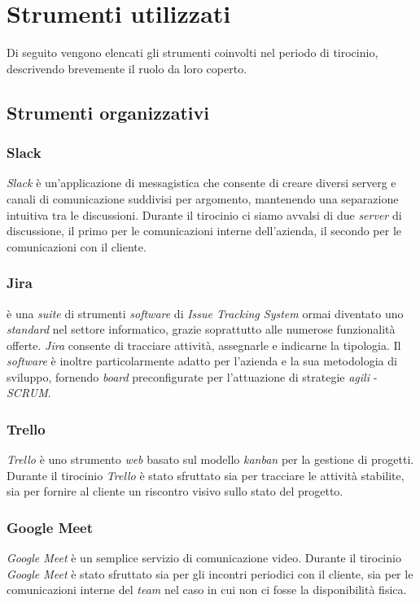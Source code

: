 \section{Strumenti utilizzati}
Di seguito vengono elencati gli strumenti coinvolti nel periodo di tirocinio, descrivendo brevemente il ruolo da loro coperto.

\subsection{Strumenti organizzativi}
\subsubsection{Slack} \textit{Slack} è un'applicazione di messagistica che consente di creare diversi \gls{serverg} e canali di comunicazione suddivisi per argomento, mantenendo una separazione intuitiva tra le discussioni. Durante il tirocinio ci siamo avvalsi di due \textit{server} di discussione, il primo per le comunicazioni interne dell'azienda, il secondo per le comunicazioni con il cliente.

\subsubsection{Jira} è una \textit{suite} di strumenti \textit{software} di \textit{Issue Tracking System} ormai diventato uno \textit{standard} nel settore informatico, grazie soprattutto alle numerose funzionalità offerte. \textit{Jira} consente di tracciare attività, assegnarle e indicarne la tipologia. Il \textit{software} è inoltre particolarmente adatto per l'azienda e la sua metodologia di sviluppo, fornendo \textit{board} preconfigurate per l'attuazione di strategie \textit{agili} - \textit{SCRUM}. 

\subsubsection{Trello} \textit{Trello} è uno strumento \textit{web} basato sul modello \textit{kanban} per la gestione di progetti. Durante il tirocinio \textit{Trello} è stato sfruttato sia per tracciare le attività stabilite, sia per fornire al cliente un riscontro visivo sullo stato del progetto.


\subsubsection{Google Meet} \textit{Google Meet} è un semplice servizio di comunicazione video. Durante il tirocinio \textit{Google Meet} è stato sfruttato sia per gli incontri periodici con il cliente, sia per le comunicazioni interne del \textit{team} nel caso in cui non ci fosse la disponibilità fisica.

